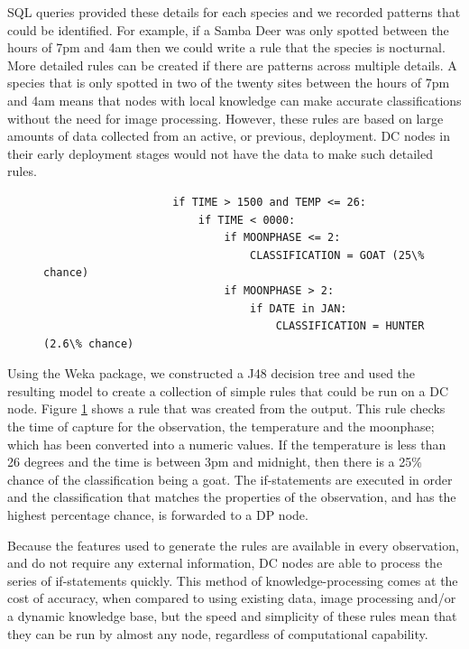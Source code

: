 			SQL queries provided these details for each species and we recorded patterns that could be identified. For example, if a Samba Deer was only spotted between the hours of 7pm and 4am then we could write a rule that the species is nocturnal. More detailed rules can be created if there are patterns across multiple details. A species that is only spotted in two of the twenty sites between the hours of 7pm and 4am means that nodes with local knowledge can make accurate classifications without the need for image processing. However, these rules are based on large amounts of data collected from an active, or previous, deployment. DC nodes in their early deployment stages would not have the data to make such detailed rules.

			\begin{figure}\label{imp:lst:rule1}
				\begin{lstlisting}
					if TIME > 1500 and TEMP <= 26:
						if TIME < 0000:
							if MOONPHASE <= 2:
								CLASSIFICATION = GOAT (25\% chance)
							if MOONPHASE > 2:
								if DATE in JAN:
									CLASSIFICATION = HUNTER (2.6\% chance)
				\end{lstlisting}
			\end{figure}
			
			Using the Weka package, we constructed a J48 decision tree and used the resulting model to create a collection of simple rules that could be run on a DC node. Figure \ref{imp:lst:rule1} shows a rule that was created from the output. This rule checks the time of capture for the observation, the temperature and the moonphase; which has been converted into a numeric values. If the temperature is less than 26 degrees and the time is between 3pm and midnight, then there is a 25\% chance of the classification being a goat. The if-statements are executed in order and the classification that matches the properties of the observation, and has the highest percentage chance, is forwarded to a DP node.
            
            Because the features used to generate the rules are available in every observation, and do not require any external information, DC nodes are able to process the series of if-statements quickly. This method of knowledge-processing comes at the cost of accuracy, when compared to using existing data, image processing and/or a dynamic knowledge base, but the speed and simplicity of these rules mean that they can be run by almost any node, regardless of computational capability.

		
